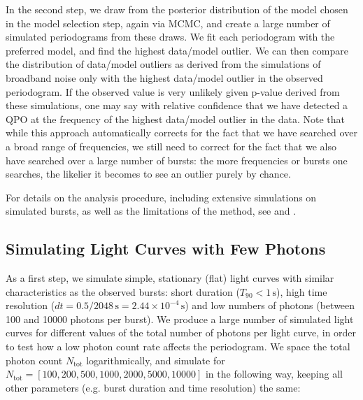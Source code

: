 \documentclass[numberedappendix]{emulateapj}
\begin{document}
In the second step, we draw from the posterior distribution of the model chosen in the model selection step, again via MCMC, and create a large number of simulated periodograms from these draws. We fit each periodogram with the preferred model, and find the highest data/model outlier. We can then compare the distribution of data/model outliers as derived from the simulations of broadband noise only with the highest data/model outlier in the observed periodogram. If the observed value is very unlikely given p-value derived from these simulations, one may say with relative confidence that we have detected a QPO at the frequency of the highest data/model outlier in the data. Note that while this approach automatically corrects for the fact that we have searched over a broad range of frequencies, we still need to correct for the fact that we also have searched over a large number of bursts: the more frequencies or bursts one searches, the likelier it becomes to see an outlier purely by chance. 

For details on the analysis procedure, including extensive simulations on simulated bursts, as well as the limitations of the method, see \citet{huppenkothen13} and \citet{vaughan2010}.


\subsection{Simulating Light Curves with Few Photons}

As a first step, we simulate simple, stationary (flat) light curves with similar characteristics as the observed bursts: short duration ($T_{90} < 1 \, \mathrm{s}$), high time resolution ($dt = 0.5/2048 \, \mathrm{s} = 2.44\times 10^{-4} \, \mathrm{s}$) and low numbers of photons (between 100 and 10000 photons per burst). 
We produce a large number of simulated light curves for different values of the total number of photons per light curve, in order to test how a low photon count rate affects the periodogram. We space the total photon count $N_{\mathrm{tot}}$ logarithmically, and simulate for $N_{\mathrm{tot}} = [100, 200, 500, 1000, 2000, 5000, 10000]$ in the following way, keeping all other parameters (e.g. burst duration and time resolution) the same:
\end{document}
